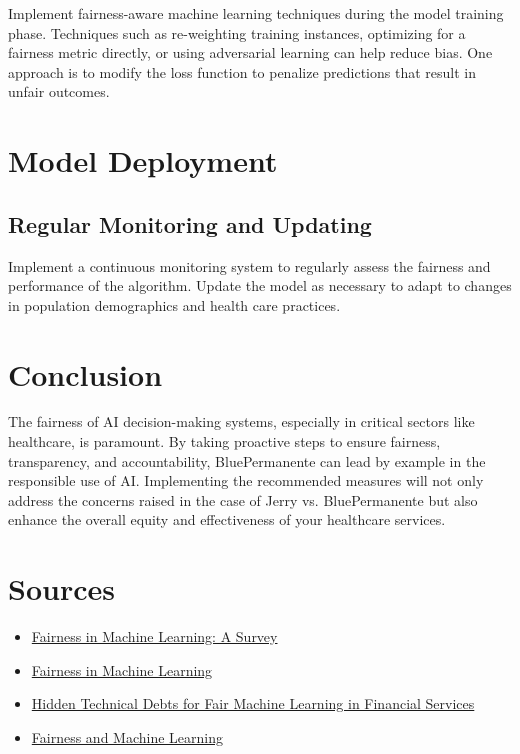 \documentclass[11pt]{article}
\begin{document}
Implement fairness-aware machine learning techniques during the model training phase. Techniques such as re-weighting training instances, optimizing for a fairness metric directly, or using adversarial learning can help reduce bias. One approach is to modify the loss function to penalize predictions that result in unfair outcomes.

\section{Model Deployment}

\subsection{Regular Monitoring and Updating}

Implement a continuous monitoring system to regularly assess the fairness and performance of the algorithm. Update the model as necessary to adapt to changes in population demographics and health care practices.

\section{Conclusion}

The fairness of AI decision-making systems, especially in critical sectors like healthcare, is paramount. By taking proactive steps to ensure fairness, transparency, and accountability, BluePermanente can lead by example in the responsible use of AI. Implementing the recommended measures will not only address the concerns raised in the case of Jerry vs. BluePermanente but also enhance the overall equity and effectiveness of your healthcare services.

\section{Sources}
\begin{itemize}
    \item \href{https://arxiv.org/abs/2010.04053}{Fairness in Machine Learning: A Survey}
    \item \href{https://en.wikipedia.org/wiki/Fairness_(machine_learning)}{Fairness in Machine Learning}
    \item \href{https://arxiv.org/abs/2103.10510}{Hidden Technical Debts for Fair Machine Learning in Financial Services}
    \item \href{https://www.fairmlbook.org/classification.html}{Fairness and Machine Learning}
\end{itemize}
\end{document}
